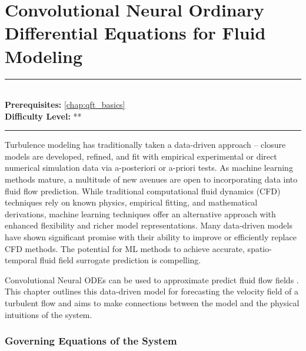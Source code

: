 \documentclass[book.tex]{subfiles}
\begin{document}

\chapter{Convolutional Neural Ordinary Differential Equations for Fluid Modeling}

\label{chap:ml_fluid}
\noindent\rule{11cm}{0.4pt} \\
\textbf{Prerequisites:} \autoref{chap:qft_basics}  \\
\textbf{Difficulty Level:} ** \\
\noindent\rule{11cm}{0.4pt}
\vspace{5mm}


Turbulence modeling has traditionally taken a data-driven approach – closure models are developed, refined, and fit with empirical experimental or direct numerical simulation data via a-posteriori or a-priori tests. As machine learning methods mature, a multitude of new avenues are open to incorporating data into fluid flow prediction. While traditional computational fluid dynamics (CFD) techniques rely on known physics, empirical fitting, and mathematical derivations, machine learning techniques offer an alternative approach with enhanced flexibility and richer model representations. Many data-driven models have shown significant promise with their ability to improve or efficiently replace CFD methods. The potential for ML methods to achieve accurate, spatio-temporal fluid field surrogate prediction is compelling. 

Convolutional Neural ODEs can be used to approximate predict fluid flow fields \cite{shankar2020learning}. This chapter outlines this data-driven model for forecasting the velocity field of a turbulent flow and aims to make connections between the model and the physical intuitions of the system.

\subsection{Governing Equations of the System}
\end{document}
